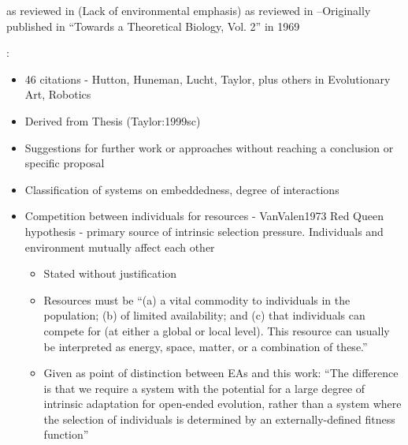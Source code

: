 \autocite{VonNeumann1966} as reviewed in \autocite{Taylor:1999sc} (Lack of environmental emphasis)
\autocite{Waddington2008} as reviewed in \autocite{Taylor:1999sc}--Originally published in ``Towards a Theoretical Biology, Vol. 2'' in 1969


\autocite{Taylor2001}:

\begin{itemize}
	\item
	      	
	      46 citations - Hutton, Huneman, Lucht, Taylor, plus others in
	      Evolutionary Art, Robotics
	      	
	\item
	      	
	      Derived from Thesis (Taylor:1999sc)
	      	
	\item
	      	
	      Suggestions for further work or approaches without reaching a
	      conclusion or specific proposal
	      	
	\item
	      	
	      Classification of systems on embeddedness, degree of interactions
	      	
	\item
	      	
	      Competition between individuals for resources - VanValen1973 Red Queen
	      hypothesis - primary source of intrinsic selection pressure.
	      Individuals and environment mutually affect each other
	      
	      \begin{itemize}
	      	\item
	      	      		
	      	      Stated without justification
	      	      		
	      	\item
	      	      		
	      	      Resources must be ``(a) a vital commodity to individuals in the
	      	      population; (b) of limited availability; and (c) that individuals
	      	      can compete for (at either a global or local level). This resource
	      	      can usually be interpreted as energy, space, matter, or a
	      	      combination of these.''
	      	      		
	      	\item
	      	      		
	      	      Given as point of distinction between EAs and this work: ``The
	      	      difference is that we require a system with the potential for a
	      	      large degree of intrinsic adaptation for open-ended evolution,
	      	      rather than a system where the selection of individuals is
	      	      determined by an externally-defined fitness function''
	      	      		

\end{itemize}
\end{itemize}
